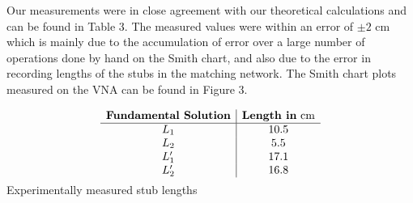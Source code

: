 \documentclass[10pt]{article}
\begin{document}
Our measurements were in close agreement with our theoretical calculations and can be found in Table 3. 
The measured values were within an error of $\pm2 \text{ cm}$ which is mainly due to the accumulation of error 
over a large number of operations done by hand on the Smith chart, and also due to the error in recording lengths 
of the stubs in the matching network. The Smith chart plots measured on the VNA can be found in Figure 3.

\begin{table}[h]
  \[
    \begin{array}{c|c}
        \textbf{Fundamental Solution} & \textbf{Length in} \text{ cm}\\ \hline
        L_1 &  10.5\\
        L_2 & 5.5\\
        L_1' & 17.1 \\
        L_2' & 16.8 \vspace{-0.25cm}
    \end{array}
\]
\caption{Experimentally measured stub lengths}
\end{table}
\end{document}
